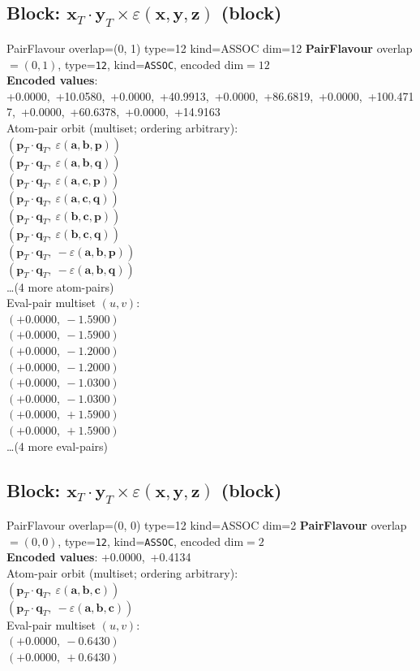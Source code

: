 \documentclass[a4paper,11pt]{article}
\newcommand{\fpbeomcfokjooi}[2]{\mathbf{#1}_T \cdot \mathbf{#2}_T}
\newcommand{\kblbmcpggoncpf}[3]{\varepsilon(\mathbf{#1},\mathbf{#2},\mathbf{#3})}
\begin{document}
\subsection{Block: $\fpbeomcfokjooi{x}{y} \times \kblbmcpggoncpf{x}{y}{z}$  (block)}
    PairFlavour  overlap=(0, 1)  type=12  kind=ASSOC  dim=12
\textbf{PairFlavour} overlap$=(0, 1)$, type=\texttt{12}, kind=\texttt{ASSOC}, encoded dim$=12$\\
\textbf{      Encoded values}: +0.0000,\ +10.0580,\ +0.0000,\ +40.9913,\ +0.0000,\ +86.6819,\ +0.0000,\ +100.4717,\ +0.0000,\ +60.6378,\ +0.0000,\ +14.9163\\
\quad Atom-pair orbit (multiset; ordering arbitrary):\\
$(\fpbeomcfokjooi{p}{q},\ \kblbmcpggoncpf{a}{b}{p})$\\
$(\fpbeomcfokjooi{p}{q},\ \kblbmcpggoncpf{a}{b}{q})$\\
$(\fpbeomcfokjooi{p}{q},\ \kblbmcpggoncpf{a}{c}{p})$\\
$(\fpbeomcfokjooi{p}{q},\ \kblbmcpggoncpf{a}{c}{q})$\\
$(\fpbeomcfokjooi{p}{q},\ \kblbmcpggoncpf{b}{c}{p})$\\
$(\fpbeomcfokjooi{p}{q},\ \kblbmcpggoncpf{b}{c}{q})$\\
$(\fpbeomcfokjooi{p}{q},\ -\kblbmcpggoncpf{a}{b}{p})$\\
$(\fpbeomcfokjooi{p}{q},\ -\kblbmcpggoncpf{a}{b}{q})$\\
\quad \ldots (4 more atom-pairs)\\
\quad Eval-pair multiset $(u, v)$:\\
$(+0.0000,\ -1.5900)$\\
$(+0.0000,\ -1.5900)$\\
$(+0.0000,\ -1.2000)$\\
$(+0.0000,\ -1.2000)$\\
$(+0.0000,\ -1.0300)$\\
$(+0.0000,\ -1.0300)$\\
$(+0.0000,\ +1.5900)$\\
$(+0.0000,\ +1.5900)$\\
\quad \ldots (4 more eval-pairs)\\

\subsection{Block: $\fpbeomcfokjooi{x}{y} \times \kblbmcpggoncpf{x}{y}{z}$  (block)}
    PairFlavour  overlap=(0, 0)  type=12  kind=ASSOC  dim=2
\textbf{PairFlavour} overlap$=(0, 0)$, type=\texttt{12}, kind=\texttt{ASSOC}, encoded dim$=2$\\
\textbf{      Encoded values}: +0.0000,\ +0.4134\\
\quad Atom-pair orbit (multiset; ordering arbitrary):\\
$(\fpbeomcfokjooi{p}{q},\ \kblbmcpggoncpf{a}{b}{c})$\\
$(\fpbeomcfokjooi{p}{q},\ -\kblbmcpggoncpf{a}{b}{c})$\\
\quad Eval-pair multiset $(u, v)$:\\
$(+0.0000,\ -0.6430)$\\
$(+0.0000,\ +0.6430)$\\
\end{document}
